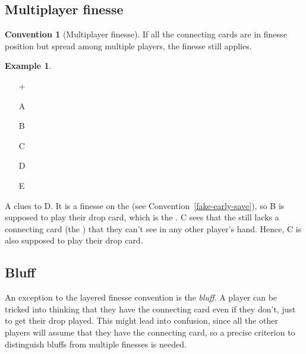 \documentclass[a4paper]{article}
\theoremstyle{plain}
\theoremstyle{definition}
\newtheorem{example}[theorem]{Example}
\newtheorem{convention}[theorem]{Convention}
\begin{document}
\subsection{Multiplayer finesse}

\begin{convention}[Multiplayer finesse]
	\label{multiplayer-finesse}
	If all the connecting cards are in finesse position but spread among multiple players, the finesse still applies.
\end{convention}

\begin{example} \hfill \\
	\begin{minipage}{0.45\textwidth}
		\begin{itemize}
			\item[\Large +]      
			\item[\Large A]    
			\item[\Large B]    
			\item[\Large C]    
			\item[\Large D]    
			\item[\Large E]    
		\end{itemize}
	\end{minipage}%
	\begin{minipage}{0.55\textwidth}
		A clues  to D. It is a finesse on the  (see Convention~\ref{fake-early-save}), so B is supposed to play their drop card, which is the . C sees that the  still lacks a connecting card (the ) that they can't see in any other player's hand. Hence, C is also supposed to play their drop card.
	\end{minipage}
\end{example} \vspace{0.15 cm}

\subsection{Bluff}

An exception to the layered finesse convention is the \emph{bluff}. A player can be tricked into thinking that they have the connecting card even if they don't, just to get their drop played. This might lead into confusion, since all the other players will assume that they have the connecting card, so a precise criterion to distinguish bluffs from multiple finesses is needed.
\end{document}

